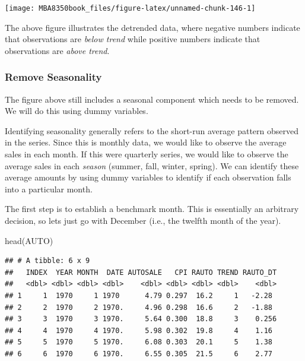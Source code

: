 \documentclass[
]{book}
\newenvironment{Shaded}{\begin{snugshade}}{\end{snugshade}}
\newcommand{\FunctionTok}[1]{\textcolor[rgb]{0.00,0.00,0.00}{#1}}
\newcommand{\NormalTok}[1]{#1}
\begin{document}
\begin{center}\texttt{[image: MBA8350book\_files/figure-latex/unnamed-chunk-146-1]} \end{center}

The above figure illustrates the detrended data, where negative numbers indicate that observations are \emph{below trend} while positive numbers indicate that observations are \emph{above trend}.

\hypertarget{remove-seasonality}{%
\subsubsection*{Remove Seasonality}\label{remove-seasonality}}

The figure above still includes a seasonal component which needs to be removed. We will do this using dummy variables.

Identifying seasonality generally refers to the short-run average pattern observed in the series. Since this is monthly data, we would like to observe the average sales in each month. If this were quarterly series, we would like to observe the average sales in each \emph{season} (summer, fall, winter, spring). We can identify these average amounts by using dummy variables to identify if each observation falls into a particular month.

The first step is to establish a benchmark month. This is essentially an arbitrary decision, so lets just go with December (i.e., the twelfth month of the year).

\begin{Shaded}
\begin{Highlighting}[]
\FunctionTok{head}\NormalTok{(AUTO)}
\end{Highlighting}
\end{Shaded}

\begin{verbatim}
## # A tibble: 6 x 9
##   INDEX  YEAR MONTH  DATE AUTOSALE   CPI RAUTO TREND RAUTO_DT
##   <dbl> <dbl> <dbl> <dbl>    <dbl> <dbl> <dbl> <dbl>    <dbl>
## 1     1  1970     1 1970      4.79 0.297  16.2     1   -2.28 
## 2     2  1970     2 1970.     4.96 0.298  16.6     2   -1.88 
## 3     3  1970     3 1970.     5.64 0.300  18.8     3    0.256
## 4     4  1970     4 1970.     5.98 0.302  19.8     4    1.16 
## 5     5  1970     5 1970.     6.08 0.303  20.1     5    1.38 
## 6     6  1970     6 1970.     6.55 0.305  21.5     6    2.77
\end{verbatim}
\end{document}
